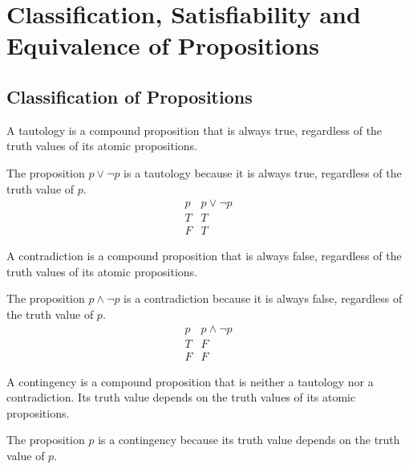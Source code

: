 \section{Classification, Satisfiability and Equivalence of Propositions}
\subsection{Classification of Propositions}
\begin{definition}[Tautology]
    A tautology is a compound proposition that is always true, regardless of the truth values of its atomic propositions.
\end{definition}
\begin{eg}
    The proposition \(p \lor \neg p\) is a tautology because it is always true, regardless of the truth value of \(p\).
    \[
        \begin{array}{c|c}
            p & p \lor \neg p \\
            \hline
            T & T \\
            F & T
        \end{array}
    \]
\end{eg}

\begin{definition}[Contradiction]
    A contradiction is a compound proposition that is always false, regardless of the truth values of its atomic propositions.
\end{definition}
\begin{eg}
    The proposition \(p \land \neg p\) is a contradiction because it is always false, regardless of the truth value of \(p\).
    \[
        \begin{array}{c|c}
            p & p \land \neg p \\
            \hline
            T & F \\
            F & F
        \end{array}
    \]
\end{eg}

\begin{definition}[Contingency]
    A contingency is a compound proposition that is neither a tautology nor a contradiction. Its truth value depends on the truth values of its atomic propositions.
\end{definition}
\begin{eg}
    The proposition $p$ is a contingency because its truth value depends on the truth value of $p$.
\end{eg}

